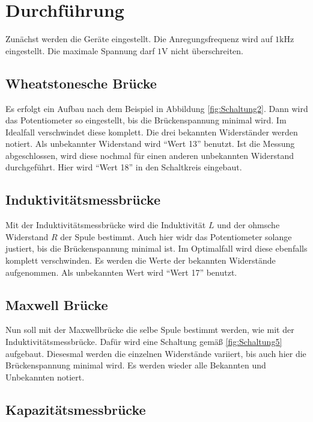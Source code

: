 \section{Durchführung}
\label{sec:Durchführung}

Zunächst werden die Geräte eingestellt.
Die Anregungsfrequenz wird auf $1 \si{\kilo\hertz}$ eingestellt.
Die maximale Spannung darf $1 \si{\volt}$ nicht überschreiten.

\subsection{Wheatstonesche Brücke} \label{sec:wheatdurchf}
Es erfolgt ein Aufbau nach dem Beispiel in Abbildung \ref{fig:Schaltung2}.
Dann wird das Potentiometer so eingestellt, bis die Brückenspannung minimal wird.
Im Idealfall verschwindet diese komplett.
Die drei bekannten Widerständer werden notiert.
Als unbekannter Widerstand wird \enquote{Wert 13} benutzt.
Ist die Messung abgeschlossen, wird diese nochmal für einen anderen unbekannten Widerstand durchgeführt.
Hier wird \enquote{Wert 18} in den Schaltkreis eingebaut.

\subsection{Induktivitätsmessbrücke} \label{sec:induktdurchf}

Mit der Induktivitätsmessbrücke wird die Induktivität $L$ und der ohmsche Widerstand $R$ der Spule bestimmt.
Auch hier widr das Potentiometer solange justiert, bis die Brückenspannung minimal ist.
Im Optimalfall wird diese ebenfalls komplett verschwinden.
Es werden die Werte der bekannten Widerstände aufgenommen.
Als unbekannten Wert wird \enquote{Wert 17} benutzt.

\subsection{Maxwell Brücke}

Nun soll mit der Maxwellbrücke die selbe Spule bestimmt werden, wie mit der Induktivitätsmessbrücke.
Dafür wird eine Schaltung gemäß \ref{fig:Schaltung5} aufgebaut.
Diesesmal werden die einzelnen Widerstände variiert, bis auch hier die 
Brückenspannung minimal wird.
Es werden wieder alle Bekannten und Unbekannten notiert.

\subsection{Kapazitätsmessbrücke}

